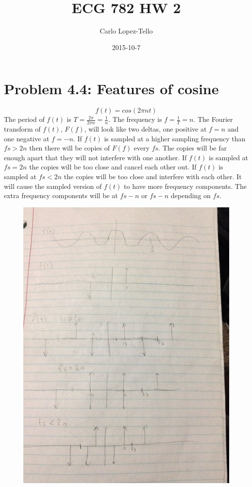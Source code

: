 \documentclass{article}
\title{ECG 782 HW 2}
\date{2015-10-7}
\author{Carlo Lopez-Tello}
\begin{document}
\maketitle
	\newpage
	\section{Problem 4.4: Features of cosine}
	\[f(t) = cos(2\pi nt)\]
	The period of \(f(t)\) is \(T=\frac{2\pi}{2\pi n}=\frac{1}{n}\).
	\newline
	The frequency is \(f=\frac{1}{T}=n\).
	\newline
	The Fourier transform of \(f(t)\), \(F(f)\), will look like two deltas, one positive at \(f=n\) and one negative at \(f = -n\). If \(f(t)\) is sampled at a higher sampling frequency than \(fs>2n\) then there will be copies of \(F(f)\) every \(fs\). The copies will be far enough apart that they will not interfere with one another. 
	If \(f(t)\) is sampled at \(fs=2n\) the copies will be too close and cancel each other out.
	If \(f(t)\) is sampled at \(fs<2n\) the copies will be too close and interfere with each other. It will cause the sampled version of \(f(t)\) to have more frequency components. The extra frequency components will be at \(fs-n\) or \(fs-n\) depending on \(fs\).
	
	\begin{figure}[H]
		\includegraphics[width=\linewidth]{fig1.JPG}
	\end{figure}
	
\end{document}
